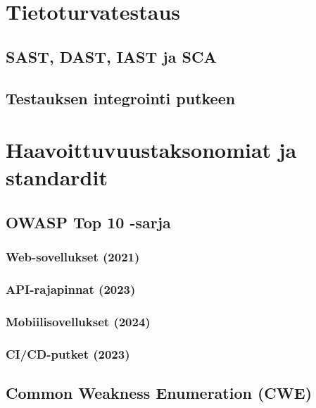 \documentclass[bscthesis,finnish,oneside,biblatex]{uefcsthesis}
\begin{document}


    \section{Tietoturvatestaus}
    \label{sec:testing}

    \subsection{SAST, DAST, IAST ja SCA}

    \subsection{Testauksen integrointi putkeen}



    \section{Haavoittuvuustaksonomiat ja standardit}
    \label{sec:taxonomies}

    \subsection{OWASP Top 10 -sarja}

    \subsubsection{Web-sovellukset (2021)}   %

    \subsubsection{API-rajapinnat (2023)}     %

    \subsubsection{Mobiilisovellukset (2024)} %

    \subsubsection{CI/CD-putket (2023)}       %

    \subsection{Common Weakness Enumeration (CWE)}
\end{document}
